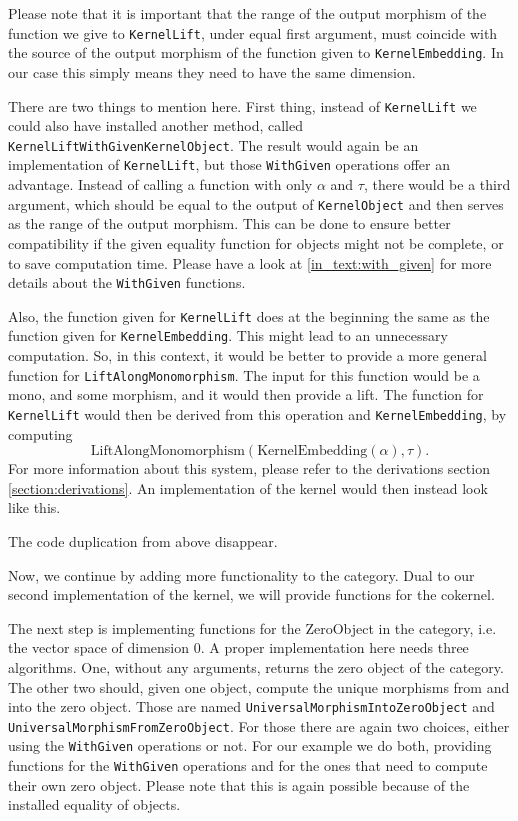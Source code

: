 Please note that it is important that the range of the output morphism of the function we give to \texttt{KernelLift},
under equal first argument, must coincide with the source of the output morphism of the function given to \texttt{KernelEmbedding}.
In our case this simply means they need to have the same dimension.



There are two things to mention here.
First thing, instead of \texttt{KernelLift} we could also have installed another method,
called \texttt{KernelLiftWithGivenKernelObject}. The result would again be an implementation of \texttt{KernelLift}, but those
\texttt{WithGiven} operations offer an advantage. Instead of calling a function with only $\alpha$ and $\tau$, there
would be a third argument, which should be equal to the output of \texttt{KernelObject} and then serves as the range of the output morphism.
This can be done to ensure better compatibility if the given equality function for objects might not be complete, or to save computation time.
Please have a look at \ref{in_text:with_given} for more details about the \texttt{WithGiven} functions.

Also, the function given for \texttt{KernelLift} does at the beginning the same as the function given for \texttt{KernelEmbedding}. This might lead to
an unnecessary computation. So, in this context, it would be better to provide a more general function for \texttt{LiftAlongMonomorphism}.
The input for this function would be a mono, and some morphism, and it would then provide a lift. The function for \texttt{KernelLift} would then be derived
from this operation and \texttt{KernelEmbedding}, by computing
\[
 \mathrm{LiftAlongMonomorphism} \left( \mathrm{KernelEmbedding} \left( \alpha \right), \tau \right).
\]
For more information about this system, please refer to the derivations section \ref{section:derivations}.
An implementation of the kernel would then instead look like this.



The code duplication from above disappear.

Now, we continue by adding more functionality to the category. Dual to our second implementation of the kernel,
we will provide functions for the cokernel.



The next step is implementing functions for the \textrm{ZeroObject} in the category, i.e. the vector space
of dimension 0. A proper implementation here needs three algorithms. One, without any arguments, returns the
zero object of the category. The other two should, given one object, compute the unique morphisms from and into
the zero object. Those are named \texttt{UniversalMorphismIntoZeroObject} and \texttt{UniversalMorphismFromZeroObject}.
For those there are again two choices, either using the \texttt{WithGiven} operations or not.
For our example we do both, providing functions for the \texttt{WithGiven} operations and for the ones that
need to compute their own zero object. Please note that this is again possible because of the installed equality of objects.


